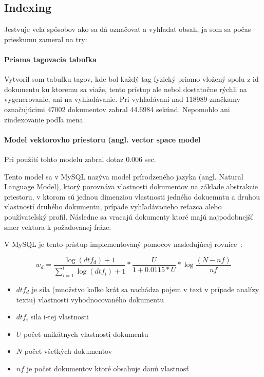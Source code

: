 \subsection{Indexing}

Jestvuje veľa spôsobov ako sa dá označovať a vyhľadať obsah, ja som sa počas prieskumu zameral na try:

\paragraph{Priama tagovacia tabuľka}

Vytvoril som tabuľku tagov, kde bol každý tag fyzický priamo vložený spolu z id dokumentu ku ktoremu sa viaže,
tento prístup ale nebol dostatočne rýchli na vygenerovanie, ani na vyhľadávanie. Pri vyhľadávaní nad 118989 značkamy 
označujúcimi 47002 dokumentov zabral 44.6984 sekúnd. Nepomohlo ani zindexovanie podľa mena.

\paragraph{Model vektorovho priestoru (angl. vector space model}

Pri použití tohto modelu zabral dotaz 0.006 sec.

Tento model sa v MySQL nazýva model prírodzeného jazyka (angl. Natural Language Model),
ktorý porovnáva vlastnosti dokumentov na základe abstrakcie priestoru,
v ktorom sú jednou dimenziou vlastnosti jedného dokuemntu a druhou vlastností druhého
dokumentu, prípade vyhľadávacieho reťazca alebo používateľský profil.
Následne sa vracajú dokumenty ktoré majú najpodobnejší smer vektora k požadovanej fráze.

V MySQL je tento prístup implementovaný pomocov nasledujúcej rovnice \cite{14}:

\[
    w_d = \frac{\log(dtf_d) + 1}{\sum_{i=1}^{t} \log (dtf_i) + 1} *
        \frac{U}{1+0.0115 * U} *
        \log \frac {(N-nf)}{nf}
\]

\begin{itemize}
\item{\(dtf_d\) je sila (množstvo koľko krát sa nachádza pojem v text v prípade analízy textu)
    vlastnosti vyhodnocovaného dokumentu}
\item{\(dtf_i\) sila i-tej vlastnosti}
\item{\(U\) počet unikátnych vlastnosti dokumentu}
\item{\(N\) počet všetkých dokumentov}
\item{\(nf\) je počet dokumentov ktoré obsahuje danú vlastnosť}
\end{itemize}

